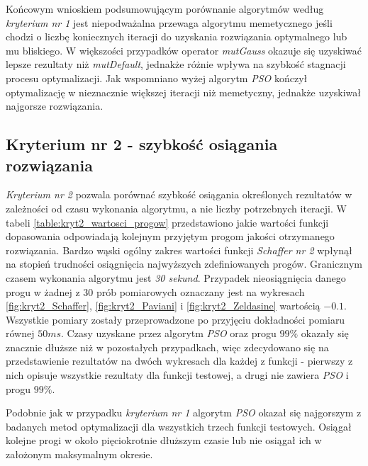 \FloatBarrier

\par
Końcowym wnioskiem podsumowującym porównanie algorytmów według \emph{kryterium nr 1} jest niepodważalna przewaga algorytmu memetycznego jeśli chodzi o liczbę koniecznych iteracji do uzyskania rozwiązania optymalnego lub mu bliskiego. W większości przypadków operator \emph{mutGauss} okazuje się uzyskiwać lepsze rezultaty niż \emph{mutDefault}, jednakże różnie wpływa na szybkość stagnacji procesu optymalizacji. Jak wspomniano wyżej algorytm \emph{PSO} kończył optymalizację w nieznacznie większej iteracji niż memetyczny, jednakże uzyskiwał najgorsze rozwiązania.


\subsection{Kryterium nr 2 - szybkość osiągania rozwiązania}
%

\par
\emph{Kryterium nr 2} pozwala porównać szybkość osiągania określonych rezultatów w zależności od czasu wykonania algorytmu, a nie liczby potrzebnych iteracji. W tabeli \ref{table:kryt2_wartosci_progow} przedstawiono jakie wartości funkcji dopasowania odpowiadają kolejnym przyjętym progom jakości otrzymanego rozwiązania. Bardzo wąski ogólny zakres wartości funkcji \emph{Schaffer nr 2} wpłynął na stopień trudności osiągnięcia najwyższych zdefiniowanych progów. Granicznym czasem wykonania algorytmu jest \emph{30 sekund}. Przypadek nieosiągnięcia danego progu w żadnej z 30 prób pomiarowych oznaczany jest na wykresach \ref{fig:kryt2_Schaffer}, \ref{fig:kryt2_Paviani} i \ref{fig:kryt2_Zeldasine} wartością $-0.1$. Wszystkie pomiary zostały przeprowadzone po przyjęciu dokładności pomiaru równej $50 ms$. Czasy uzyskane przez algorytm \emph{PSO} oraz progu $99\%$ okazały się znacznie dłuższe niż w pozostałych przypadkach, więc zdecydowano się na przedstawienie rezultatów na dwóch wykresach dla każdej z funkcji - pierwszy z nich opisuje wszystkie rezultaty dla funkcji testowej, a drugi nie zawiera \emph{PSO} i progu $99\%$.
\par
Podobnie jak w przypadku \emph{kryterium nr 1} algorytm \emph{PSO} okazał się najgorszym z badanych metod optymalizacji dla wszystkich trzech funkcji testowych. Osiągał kolejne progi w około pięciokrotnie dłuższym czasie lub nie osiągał ich w założonym maksymalnym okresie. 


